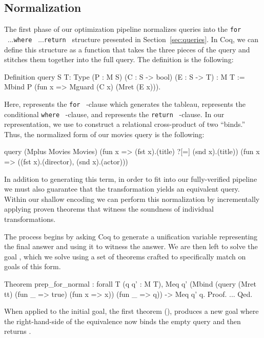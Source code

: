 \documentclass[preprint]{sigplanconf}
\newcommand{\FOR}{{\tt for} \ }
\newcommand{\WHERE}{{\tt where} \ }
\newcommand{\RETURN}{{\tt return} \ }
\newcommand{\greg}[1]{\textcolor{blue}{GREG: #1}}
\begin{document}

\subsection{Normalization}
\label{sec:normalization}

The first phase of our optimization pipeline normalizes queries into the \FOR...\WHERE...\RETURN structure presented in Section~\ref{sec:queries}.
In Coq, we can define this structure as a function that takes the three pieces of the query and stitches them together into the full query.
The definition is the following:
\begin{coq}
Definition query {S T: Type}
  (P : M S) (C : S -> bool) (E : S -> T) : M T :=
  Mbind P (fun x => Mguard (C x) (Mret (E x))).
\end{coq}
Here,  represents the \FOR-clause which generates the tableau,
 represents the conditional \WHERE-clause, and  represents the \RETURN-clause.
In our representation, we use  to construct a relational cross-product of two ``binds.''
Thus, the normalized form of our movies query is the following:
\begin{coq}
query (Mplus Movies Movies)
      (fun x => (fst x).(title) ?[=] (snd x).(title))
      (fun x => ((fst x).(director), (snd x).(actor)))
\end{coq}

In addition to generating this term, in order to fit into our fully-verified pipeline we must also guarantee that the transformation yields an equivalent query.
Within our shallow encoding we can perform this normalization by incrementally applying proven theorems that witness the soundness of individual transformations.

The process begins by asking Coq to generate a unification variable representing the final answer and using it to witness the answer.
We are then left to solve the goal , which we solve using a set of theorems crafted to specifically match on goals of this form.
\begin{coq}
Theorem prep_for_normal : forall {T} (q q' : M T),
  Meq q' (Mbind (query (Mret tt) (fun _ => true) (fun x => x))
                       (fun _ => q)) ->
  Meq q' q.
Proof. ... Qed.
\end{coq}
When applied to the initial goal, the first theorem (), produces a new goal where the right-hand-side of the equivalence now binds the empty query and then returns .
\end{document}
